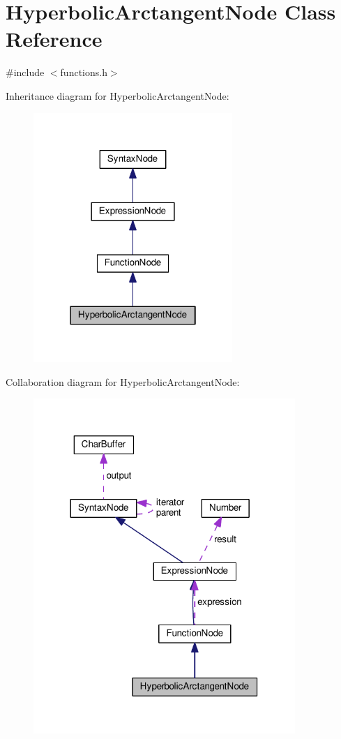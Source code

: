 \hypertarget{classHyperbolicArctangentNode}{}\section{Hyperbolic\+Arctangent\+Node Class Reference}
\label{classHyperbolicArctangentNode}


{\ttfamily \#include $<$functions.\+h$>$}



Inheritance diagram for Hyperbolic\+Arctangent\+Node\+:\nopagebreak
\begin{figure}[H]
\begin{center}
\leavevmode
\includegraphics[width=214pt]{classHyperbolicArctangentNode__inherit__graph}
\end{center}
\end{figure}


Collaboration diagram for Hyperbolic\+Arctangent\+Node\+:\nopagebreak
\begin{figure}[H]
\begin{center}
\leavevmode
\includegraphics[width=281pt]{classHyperbolicArctangentNode__coll__graph}
\end{center}
\end{figure}
